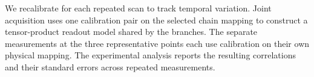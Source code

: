 We recalibrate for each repeated scan to track temporal variation.
Joint acquisition uses one calibration pair on the selected chain mapping to construct a tensor-product readout model shared by the branches.
The separate measurements at the three representative points each use calibration on their own physical mapping.
The experimental analysis reports the resulting correlations and their standard errors across repeated measurements.
